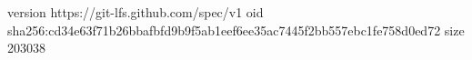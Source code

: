 version https://git-lfs.github.com/spec/v1
oid sha256:cd34e63f71b26bbafbfd9b9f5ab1eef6ee35ac7445f2bb557ebc1fe758d0ed72
size 203038
